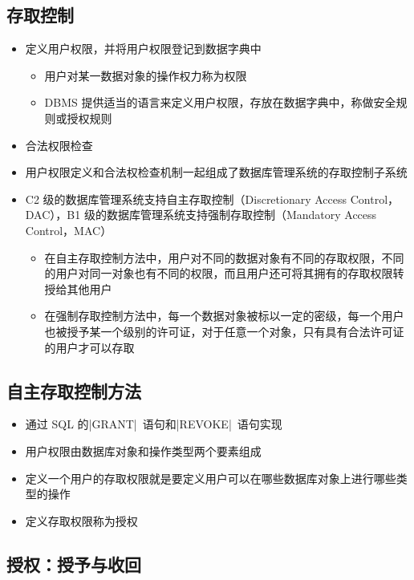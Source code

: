 \subsection{存取控制}
\begin{itemize}
    \item 定义用户权限，并将用户权限登记到数据字典中
    \begin{itemize}
        \item 用户对某一数据对象的操作权力称为权限
        \item DBMS 提供适当的语言来定义用户权限，存放在数据字典中，称做安全规则或授权规则
    \end{itemize}
    \item 合法权限检查 
    \item 用户权限定义和合法权检查机制一起组成了数据库管理系统的存取控制子系统
    \item C2 级的数据库管理系统支持自主存取控制（Discretionary Access Control，DAC），B1 级的数据库管理系统支持强制存取控制（Mandatory Access Control，MAC）
    \begin{itemize}
        \item 在自主存取控制方法中，用户对不同的数据对象有不同的存取权限，不同的用户对同一对象也有不同的权限，而且用户还可将其拥有的存取权限转授给其他用户
        \item 在强制存取控制方法中，每一个数据对象被标以一定的密级，每一个用户也被授予某一个级别的许可证，对于任意一个对象，只有具有合法许可证的用户才可以存取
    \end{itemize}
\end{itemize}

\subsection{自主存取控制方法}
\begin{itemize}
    \item 通过 SQL 的\sverb|GRANT|\ 语句和\sverb|REVOKE|\ 语句实现
    \item 用户权限由数据库对象和操作类型两个要素组成
    \item 定义一个用户的存取权限就是要定义用户可以在哪些数据库对象上进行哪些类型的操作
    \item 定义存取权限称为授权 
\end{itemize}

\subsection{授权：授予与收回}

